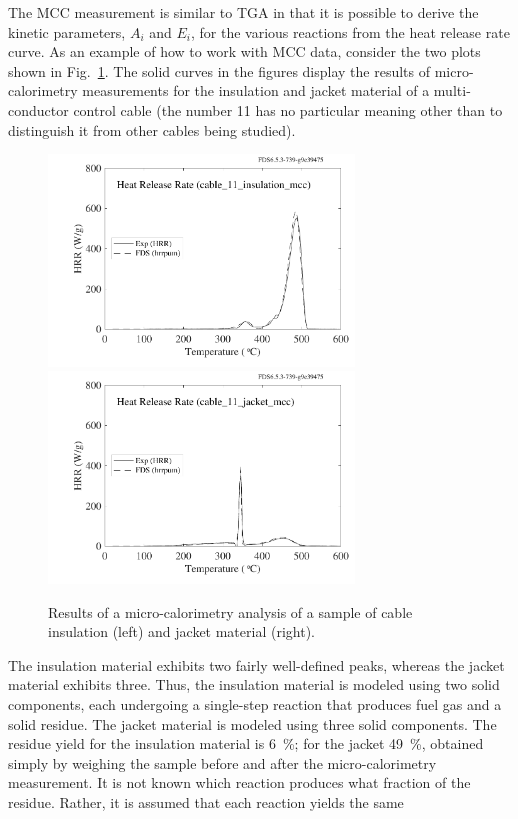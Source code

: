 \documentclass[11pt]{book}
\begin{document}
The MCC measurement is similar to TGA in that it is possible to derive the kinetic parameters, $A_i$ and $E_i$, for the various reactions from
the heat release rate curve. As an example of how to work with MCC data, consider the two plots shown in Fig.~\ref{mcc_plots}. The solid curves in the figures
display the results of micro-calorimetry measurements for the insulation and jacket material of a multi-conductor control
cable (the number 11 has no particular meaning other than to distinguish it from other cables being studied).
\begin{figure}[ht]
\includegraphics[width=3.2in]{SCRIPT_FIGURES/cable_11_insulation_mcc}
\includegraphics[width=3.2in]{SCRIPT_FIGURES/cable_11_jacket_mcc}
\caption[Results of a micro-calorimetry analysis of cable materials]{Results of a micro-calorimetry analysis of a sample of cable insulation (left) and jacket material (right).}
\label{mcc_plots}
\end{figure}
The insulation material exhibits two fairly well-defined peaks, whereas the jacket material exhibits three. Thus, the insulation
material is modeled using two solid components, each undergoing a single-step reaction that produces fuel gas and a solid residue. The jacket
material is modeled using three solid components. The residue yield for the insulation material is
6~\%; for the jacket 49~\%, obtained simply by weighing the sample before and after the micro-calorimetry measurement. It is
not known which reaction produces what fraction of the residue. Rather, it is assumed that each reaction yields the same
\end{document}
